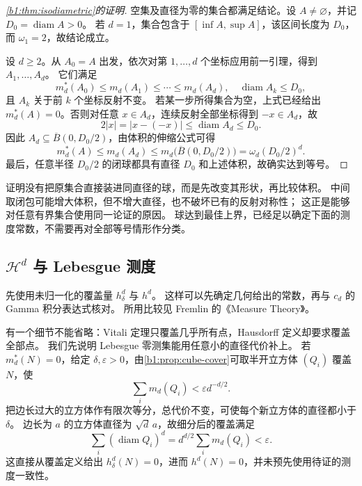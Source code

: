 \begin{proof}[\cref{b1:thm:isodiametric}的证明]
空集及直径为零的集合都满足结论。设 \(A\ne\varnothing\)，并记 \(D_0=\operatorname{diam}A>0\)。
若 \(d=1\)，集合包含于 \([\inf A,\sup A]\)，该区间长度为 \(D_0\)，而 \(\omega_1=2\)，故结论成立。

设 \(d\geq2\)。从 \(A_0=A\) 出发，依次对第 \(1,\ldots,d\) 个坐标应用前一引理，得到 \(A_1,\ldots,A_d\)。
它们满足
\[
 m_d^*(A_0)\leq m_d(A_1)\leq\cdots\leq m_d(A_d),
 \quad\operatorname{diam}A_k\leq D_0,
\]
且 \(A_k\) 关于前 \(k\) 个坐标反射不变。
若某一步所得集合为空，上式已经给出 \(m_d^*(A)=0\)。否则对任意 \(x\in A_d\)，连续反射全部坐标得到 \(-x\in A_d\)，故
\[
 2|x|=|x-(-x)|\leq\operatorname{diam}A_d\leq D_0.
\]
因此 \(A_d\subseteq\overline B(0,D_0/2)\)，由体积的伸缩公式可得
\[
 m_d^*(A)\leq m_d(A_d)
 \leq m_d\bigl(\overline B(0,D_0/2)\bigr)
 =\omega_d(D_0/2)^d.
\]
最后，任意半径 \(D_0/2\) 的闭球都具有直径 \(D_0\) 和上述体积，故确实达到等号。
\end{proof}

证明没有把原集合直接装进同直径的球，而是先改变其形状，再比较体积。
中间取闭包可能增大体积，但不增大直径，也不破坏已有的反射对称性；
这正是能够对任意有界集合使用同一论证的原因。
球达到最佳上界，已经足以确定下面的测度常数，不需要再对全部等号情形作分类。

\subsection{\texorpdfstring{\(\mathcal H^d\)}{Hd} 与 Lebesgue 测度}
\label{b1:subsec:150303}

先使用未归一化的覆盖量 \(h_\delta^d\) 与 \(h^d\)。
这样可以先确定几何给出的常数，再与 \(c_d\) 的 Gamma 积分表达式核对。
所用比较见 Fremlin 的《Measure Theory》\cite[264I]{Fremlin2016Measure}。

\ProseParagraphBreak

有一个细节不能省略：Vitali 定理只覆盖几乎所有点，Hausdorff 定义却要求覆盖全部点。
我们先说明 Lebesgue 零测集能用任意小的直径代价补上。
若 \(m_d^*(N)=0\)，给定 \(\delta,\varepsilon>0\)，由\cref{b1:prop:cube-cover}可取半开立方体 \((Q_i)\) 覆盖 \(N\)，使
\[
 \sum_i m_d(Q_i)<\varepsilon d^{-d/2}.
\]
把边长过大的立方体作有限次等分，总代价不变，可使每个新立方体的直径都小于 \(\delta\)。
边长为 \(a\) 的立方体直径为 \(\sqrt d\,a\)，故细分后的覆盖满足
\[
 \sum_i(\operatorname{diam}Q_i)^d
 =d^{d/2}\sum_i m_d(Q_i)<\varepsilon.
\]
这直接从覆盖定义给出 \(h_\delta^d(N)=0\)，进而 \(h^d(N)=0\)，并未预先使用待证的测度一致性。

